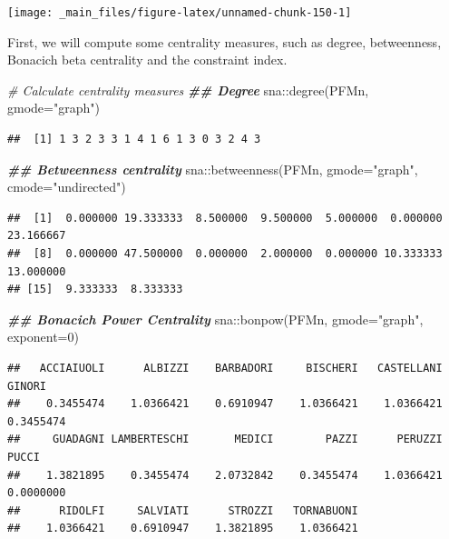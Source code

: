\documentclass[
  notitlepage,
  onecolumn,
  openany]{book}
\newenvironment{Shaded}{\begin{snugshade}}{\end{snugshade}}
\newcommand{\AttributeTok}[1]{\textcolor[rgb]{0.77,0.63,0.00}{#1}}
\newcommand{\CommentTok}[1]{\textcolor[rgb]{0.56,0.35,0.01}{\textit{#1}}}
\newcommand{\DecValTok}[1]{\textcolor[rgb]{0.00,0.00,0.81}{#1}}
\newcommand{\DocumentationTok}[1]{\textcolor[rgb]{0.56,0.35,0.01}{\textbf{\textit{#1}}}}
\newcommand{\FunctionTok}[1]{\textcolor[rgb]{0.00,0.00,0.00}{#1}}
\newcommand{\NormalTok}[1]{#1}
\newcommand{\SpecialCharTok}[1]{\textcolor[rgb]{0.00,0.00,0.00}{#1}}
\newcommand{\StringTok}[1]{\textcolor[rgb]{0.31,0.60,0.02}{#1}}
\begin{document}
\begin{center}\texttt{[image: \_main\_files/figure-latex/unnamed-chunk-150-1]} \end{center}

First, we will compute some centrality measures, such as degree, betweenness, Bonacich beta centrality and the constraint index.

\begin{Shaded}
\begin{Highlighting}[]
\CommentTok{\# Calculate centrality measures}
\DocumentationTok{\#\# Degree}
\NormalTok{sna}\SpecialCharTok{::}\FunctionTok{degree}\NormalTok{(PFMn, }\AttributeTok{gmode=}\StringTok{"graph"}\NormalTok{)}
\end{Highlighting}
\end{Shaded}

\begin{verbatim}
##  [1] 1 3 2 3 3 1 4 1 6 1 3 0 3 2 4 3
\end{verbatim}

\begin{Shaded}
\begin{Highlighting}[]
\DocumentationTok{\#\# Betweenness centrality}
\NormalTok{sna}\SpecialCharTok{::}\FunctionTok{betweenness}\NormalTok{(PFMn, }\AttributeTok{gmode=}\StringTok{"graph"}\NormalTok{, }\AttributeTok{cmode=}\StringTok{"undirected"}\NormalTok{)}
\end{Highlighting}
\end{Shaded}

\begin{verbatim}
##  [1]  0.000000 19.333333  8.500000  9.500000  5.000000  0.000000 23.166667
##  [8]  0.000000 47.500000  0.000000  2.000000  0.000000 10.333333 13.000000
## [15]  9.333333  8.333333
\end{verbatim}

\begin{Shaded}
\begin{Highlighting}[]
\DocumentationTok{\#\# Bonacich Power Centrality}
\NormalTok{sna}\SpecialCharTok{::}\FunctionTok{bonpow}\NormalTok{(PFMn, }\AttributeTok{gmode=}\StringTok{"graph"}\NormalTok{, }\AttributeTok{exponent=}\DecValTok{0}\NormalTok{)}
\end{Highlighting}
\end{Shaded}

\begin{verbatim}
##   ACCIAIUOLI      ALBIZZI    BARBADORI     BISCHERI   CASTELLANI       GINORI 
##    0.3455474    1.0366421    0.6910947    1.0366421    1.0366421    0.3455474 
##     GUADAGNI LAMBERTESCHI       MEDICI        PAZZI      PERUZZI        PUCCI 
##    1.3821895    0.3455474    2.0732842    0.3455474    1.0366421    0.0000000 
##      RIDOLFI     SALVIATI      STROZZI   TORNABUONI 
##    1.0366421    0.6910947    1.3821895    1.0366421
\end{verbatim}
\end{document}
